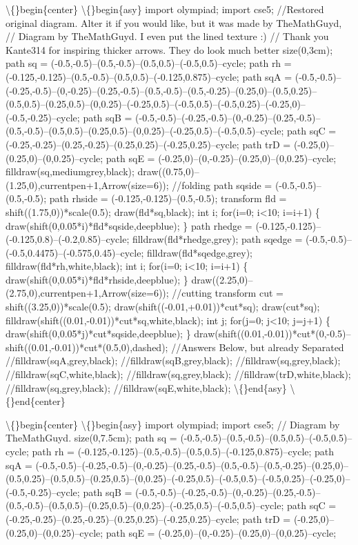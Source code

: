 \documentclass{article}
\begin{document}
\begin{enumerate}[label=\arabic*., itemsep=0.5em]
\textbackslash\{\}begin\{center\}
\textbackslash\{\}begin\{asy\}
import olympiad;
import cse5;
//Restored original diagram. Alter it if you would like, but it was made by TheMathGuyd,
// Diagram by TheMathGuyd. I even put the lined texture :)
// Thank you Kante314 for inspiring thicker arrows. They do look much better
size(0,3cm);
path sq = (-0.5,-0.5)--(0.5,-0.5)--(0.5,0.5)--(-0.5,0.5)--cycle;
path rh = (-0.125,-0.125)--(0.5,-0.5)--(0.5,0.5)--(-0.125,0.875)--cycle;
path sqA = (-0.5,-0.5)--(-0.25,-0.5)--(0,-0.25)--(0.25,-0.5)--(0.5,-0.5)--(0.5,-0.25)--(0.25,0)--(0.5,0.25)--(0.5,0.5)--(0.25,0.5)--(0,0.25)--(-0.25,0.5)--(-0.5,0.5)--(-0.5,0.25)--(-0.25,0)--(-0.5,-0.25)--cycle;
path sqB = (-0.5,-0.5)--(-0.25,-0.5)--(0,-0.25)--(0.25,-0.5)--(0.5,-0.5)--(0.5,0.5)--(0.25,0.5)--(0,0.25)--(-0.25,0.5)--(-0.5,0.5)--cycle;
path sqC = (-0.25,-0.25)--(0.25,-0.25)--(0.25,0.25)--(-0.25,0.25)--cycle;
path trD = (-0.25,0)--(0.25,0)--(0,0.25)--cycle;
path sqE = (-0.25,0)--(0,-0.25)--(0.25,0)--(0,0.25)--cycle;
filldraw(sq,mediumgrey,black);
draw((0.75,0)--(1.25,0),currentpen+1,Arrow(size=6));
//folding
path sqside = (-0.5,-0.5)--(0.5,-0.5);
path rhside = (-0.125,-0.125)--(0.5,-0.5);
transform fld = shift((1.75,0))*scale(0.5);
draw(fld*sq,black);
int i;
for(i=0; i<10; i=i+1)
\{
  draw(shift(0,0.05*i)*fld*sqside,deepblue);
\}
path rhedge = (-0.125,-0.125)--(-0.125,0.8)--(-0.2,0.85)--cycle;
filldraw(fld*rhedge,grey);
path sqedge = (-0.5,-0.5)--(-0.5,0.4475)--(-0.575,0.45)--cycle;
filldraw(fld*sqedge,grey);
filldraw(fld*rh,white,black);
int i;
for(i=0; i<10; i=i+1)
\{
  draw(shift(0,0.05*i)*fld*rhside,deepblue);
\}
draw((2.25,0)--(2.75,0),currentpen+1,Arrow(size=6));
//cutting
transform cut = shift((3.25,0))*scale(0.5);
draw(shift((-0.01,+0.01))*cut*sq);
draw(cut*sq);
filldraw(shift((0.01,-0.01))*cut*sq,white,black);
int j;
for(j=0; j<10; j=j+1)
\{
draw(shift(0,0.05*j)*cut*sqside,deepblue);
\}
draw(shift((0.01,-0.01))*cut*(0,-0.5)--shift((0.01,-0.01))*cut*(0.5,0),dashed);
//Answers Below, but already Separated
//filldraw(sqA,grey,black);
//filldraw(sqB,grey,black);
//filldraw(sq,grey,black);
//filldraw(sqC,white,black);
//filldraw(sq,grey,black);
//filldraw(trD,white,black);
//filldraw(sq,grey,black);
//filldraw(sqE,white,black);
\textbackslash\{\}end\{asy\}
\textbackslash\{\}end\{center\}



\textbackslash\{\}begin\{center\}
\textbackslash\{\}begin\{asy\}
import olympiad;
import cse5;
// Diagram by TheMathGuyd.
size(0,7.5cm);
path sq = (-0.5,-0.5)--(0.5,-0.5)--(0.5,0.5)--(-0.5,0.5)--cycle;
path rh = (-0.125,-0.125)--(0.5,-0.5)--(0.5,0.5)--(-0.125,0.875)--cycle;
path sqA = (-0.5,-0.5)--(-0.25,-0.5)--(0,-0.25)--(0.25,-0.5)--(0.5,-0.5)--(0.5,-0.25)--(0.25,0)--(0.5,0.25)--(0.5,0.5)--(0.25,0.5)--(0,0.25)--(-0.25,0.5)--(-0.5,0.5)--(-0.5,0.25)--(-0.25,0)--(-0.5,-0.25)--cycle;
path sqB = (-0.5,-0.5)--(-0.25,-0.5)--(0,-0.25)--(0.25,-0.5)--(0.5,-0.5)--(0.5,0.5)--(0.25,0.5)--(0,0.25)--(-0.25,0.5)--(-0.5,0.5)--cycle;
path sqC = (-0.25,-0.25)--(0.25,-0.25)--(0.25,0.25)--(-0.25,0.25)--cycle;
path trD = (-0.25,0)--(0.25,0)--(0,0.25)--cycle;
path sqE = (-0.25,0)--(0,-0.25)--(0.25,0)--(0,0.25)--cycle;


\end{enumerate}
\end{document}
